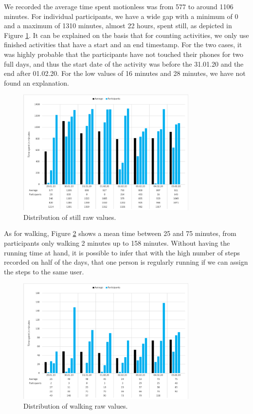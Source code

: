 
We recorded the average time spent motionless was from 577 to around 1106 minutes. For individual participants, we have a wide gap with a minimum of 0 and a maximum of 1310 minutes, almost 22 hours, spent still, as depicted in Figure \ref{fig:diagram_still}. It can be explained on the basis that for counting activities, we only use finished activities that have a start and an end timestamp. For the two cases, it was highly probable that the participants have not touched their phones for two full days, and thus the start date of the activity was before the 31.01.20 and the end after 01.02.20. For the low values of 16 minutes and 28 minutes, we have not found an explanation. 

\begin{figure}[htbp]
  \centering
  \includegraphics[width=0.8\textwidth]{figures/diagram_still}
  \caption{Distribution of still raw values.} \label{fig:diagram_still}
\end{figure}

As for walking, Figure \ref{fig:diagram_walking} shows a mean time between 25 and 75 minutes, from participants only walking 2 minutes up to 158 minutes. Without having the running time at hand, it is possible to infer that with the high number of steps recorded on half of the days, that one person is regularly running if we can assign the steps to the same user.

\begin{figure}[htbp]
  \centering
  \includegraphics[width=0.8\textwidth]{figures/diagram_walking.png}
  \caption{Distribution of walking raw values.} \label{fig:diagram_walking}
\end{figure}

